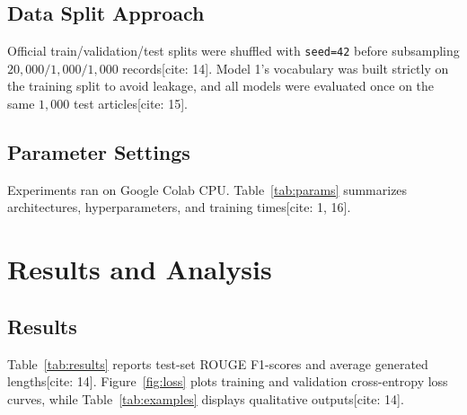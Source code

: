 \documentclass[10pt,twocolumn,a4paper]{IEEEtran}
\begin{document}
\subsection{Data Split Approach}
Official train/validation/test splits were shuffled with \texttt{seed=42} before subsampling $20,000 / 1,000 / 1,000$ records[cite: 14]. Model 1's vocabulary was built strictly on the training split to avoid leakage, and all models were evaluated once on the same $1,000$ test articles[cite: 15].

\subsection{Parameter Settings}
Experiments ran on Google Colab CPU. Table~\ref{tab:params} summarizes architectures, hyperparameters, and training times[cite: 1, 16].

\begin{table}[h]
\centering
\caption{Model architectures, hyperparameters, and runtime.}
\label{tab:params}
\footnotesize
{}
\end{table}

\section{Results and Analysis}
\subsection{Results}
Table~\ref{tab:results} reports test-set ROUGE F1-scores and average generated lengths[cite: 14]. Figure~\ref{fig:loss} plots training and validation cross-entropy loss curves, while Table~\ref{tab:examples} displays qualitative outputs[cite: 14].
\end{document}
